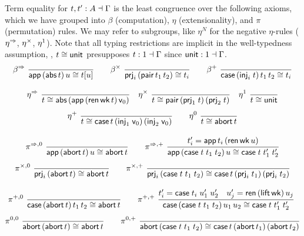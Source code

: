 \documentclass[a4paper,USenglish,cleveref, autoref]{lipics-v2019}
\begin{document}
Term equality for $t,t' : A \dashv \Gamma$ is the
least congruence over the following axioms, which we have grouped into
$\beta$ (computation), $\eta$ (extensionality), and $\pi$ (permutation)
rules.  We may refer to subgroups, like $\eta^N$ for the negative
$\eta$-rules ($\eta^\Rightarrow$, $\eta^\times$, $\eta^{1}$).  Note that all
typing restrictions are implicit in the well-typedness assumption,
\eg, $t \cong \mathsf{unit}$ presupposes $t : 1 \dashv \Gamma$
since $\mathsf{unit} : 1 \dashv \Gamma$.
\begin{gather*}
  \nru{\rbetato}{}{\tapp\,(\tabs\,t)\,u \cong \subone t u}
\qquad
  \nru{\rbetatimes}{}{\prjP i {\tpair\,t_1\,t_2} \cong t_i}
\qquad
  \nru{\rbetaplus}{}{\tcase\,(\inj i t)\,t_1\,t_2 \cong t_i}
\\[2ex]
  \nru{\retato}{}{t \cong
    \tabs\,(\tapp\,(\tren\,\twk\,t)\,\vv0)}
\quad
  \nru{\retatimes}{}{t \cong \tpair\,(\prj 1 t)\,(\prj 2 t)}
\quad
  \nru{\retaone}{}{t \cong \tunit}
\\[1ex]
  \nru{\retaplus}{}{t \cong
    \tcase\,t
      \,(\inj 1 {\vv0})
      \,(\inj 2 {\vv0})
    }
\qquad
  \nru{\retazero}{}{t \cong \tabort\,t}
\\[2ex]
  \nru{\rpi{\To}{\tyempty}}
    {}{\tapp\,(\tabort\,t)\,u \cong \tabort\,t}
\qquad
  \nru{\rpi{\To}{+}}
      {t_i' = \tapp\,t_i\,(\tren\,\twk\,u)}
      {\tapp\,(\tcase\;t\;t_1\;t_2)\,u \cong \tcase\;t\;t_1'\;t_2'}
\\[1ex]
  \nru{\rpi{\times}{\tyempty}}
    {}{\prjP i {\tabort\,t} \cong \tabort\,t}
\qquad
  \nru{\rpi{\times}{+}}
    {}{\prjP i {\tcase\;t\;t_1\;t_2} \cong
         \tcase\,t\,(\prj i {t_1})\,(\prj i {t_2})}
\\[2ex]
  \nru{\rpi{+}{\tyempty}}
    {}{\tcase\,(\tabort\,t)\,t_1\,t_2 \cong \tabort\,t}
\qquad
  \nru{\rpi{+}{+}}
      {t_i' = \tcase\;t_i\;u_1'\;u_2'
       \quad
       u_j' = \tren\,(\tlift\,\twk)\,u_j
      }
      {\tcase\,(\tcase\;t\;t_1\;t_2)\,u_1\,u_2 \cong
        \tcase\;t\;t_1'\;t_2'}
    \
\\[1ex]
  \nru{\rpi{\tyempty}{\tyempty}}
    {}{\tabort\,(\tabort\,t) \cong \tabort\,t}
\qquad
  \nru{\rpi{\tyempty}{+}}
    {}{\tabort\,(\tcase\;t\;t_1\;t_2) \cong
      \tcase\,t\,(\tabort\,t_1)\,(\tabort\,t_2)}

\end{gather*}
\end{document}

